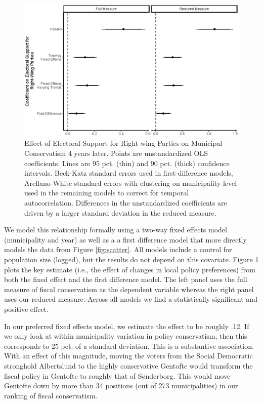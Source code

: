 \documentclass[a4paper,12pt]{article}
\begin{document}
\begin{figure}[htbp]
	\centering
	\includegraphics[scale = 0.7]{CoefPlot_18092018.eps}
	\caption{Effect of Electoral Support for Right-wing Parties on Municipal Conservatism 4 years later. Points are unstandardized OLS coefficients. Lines are 95 pct. (thin) and 90 pct. (thick) confidence intervals. Beck-Katz standard errors used in first-difference models, Arellano-White standard errors with clustering on municipality level used in the remaining models to correct for temporal autocorrelation. Differences in the unstandardized coefficients are driven by a larger standard deviation in the reduced measure.}
	\label{fig:FourYearLead}
\end{figure}



We model this relationship formally using a two-way fixed effects model (municipality and year)  as well as a a first difference model that more directly models the data from Figure \ref{fig:scatter}. All models include a control for population size (logged), but the results do not depend on this covariate. Figure \ref{fig:FourYearLead} plots the key estimate (i.e., the effect of changes in local policy preferences) from both the fixed effect and the first difference model. The  left panel uses the full measure of fiscal conservatism as the dependent variable whereas the right panel uses our reduced measure. Across all models we find a statistically significant and positive effect. 

In our preferred fixed effects model, we estimate the effect to be roughly .12. If we only look at within municipality variation in policy conservatism, then this corresponds to 25 pct. of a standard deviation.  This is a substantive association. With an effect of this magnitude, moving the voters from the Social Democratic stronghold Albertslund to the highly conservative Gentofte would transform the fiscal policy in Gentofte to roughly that of Sønderborg. This would move Gentofte down by more than 34 positions (out of 273 municipalities) in our ranking of fiscal conservatism.
\end{document}
